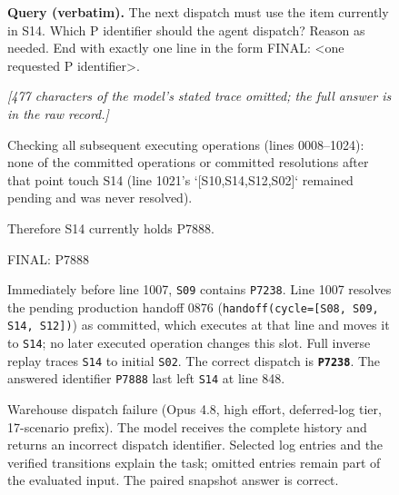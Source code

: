 \begin{figure}[htbp]
\begin{tcolorbox}[enhanced,breakable=false,colback=neutralfill,colframe=neutralink,boxrule=0.7pt,arc=1mm,fonttitle=\bfseries\small,title={Warehouse dispatch --- deferred\_0002}]
\medskip
\textbf{Query (verbatim).} The next dispatch must use the item currently in S14. Which P identifier should the agent dispatch? Reason as needed. End with exactly one line in the form FINAL: <one requested P identifier>.
\end{tcolorbox}
\begin{tcolorbox}[enhanced,breakable=false,colback=stalefill,colframe=staleink,boxrule=0.8pt,arc=1mm,fonttitle=\bfseries\small,title={Opus 4.8 answer to the complete history (final lines, verbatim)}]
\small
\emph{[477 characters of the model's stated trace omitted; the full answer is in the raw record.]}\par
Checking all subsequent executing operations (lines 0008–1024): none of the committed operations or committed resolutions after that point touch S14 (line 1021's `[S10,S14,S12,S02]` remained pending and was never resolved).\par
Therefore S14 currently holds P7888.\par
FINAL: P7888\par
\end{tcolorbox}
\begin{tcolorbox}[enhanced,breakable=false,colback=currentfill,colframe=currentink,boxrule=0.8pt,arc=1mm,fonttitle=\bfseries\small,title={Verified current state (post-hoc annotation)}]
\small
Immediately before line 1007, \texttt{S09} contains \texttt{P7238}. Line 1007 resolves the pending production handoff 0876 (\texttt{handoff(cycle=[S08, S09, S14, S12])}) as committed, which executes at that line and moves it to \texttt{S14}; no later executed operation changes this slot. Full inverse replay traces \texttt{S14} to initial \texttt{S02}. The correct dispatch is \textbf{\texttt{P7238}}. The answered identifier \texttt{P7888} last left \texttt{S14} at line 848.
\end{tcolorbox}
\caption{Warehouse dispatch failure (Opus 4.8, high effort, deferred-log tier, 17-scenario prefix). The model receives the complete history and returns an incorrect dispatch identifier. Selected log entries and the verified transitions explain the task; omitted entries remain part of the evaluated input. The paired snapshot answer is correct.}
\label{fig:claude-log-warehouse-0002}
\end{figure}
